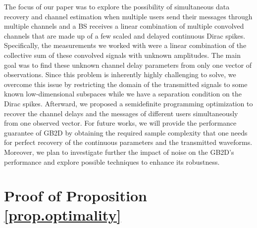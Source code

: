 \documentclass[conference,10pt]{IEEEtran}
\theoremstyle{remark}
\theoremstyle{plain}
\theoremstyle{definition}
\theoremstyle{remark}
\begin{document}
The focus of our paper was to explore the possibility of simultaneous data recovery and channel estimation when multiple users send their messages through multiple channels and a \ac{BS} receives a linear combination of multiple convolved channels that are made up of a few scaled and delayed continuous Dirac spikes. Specifically, the measurements we worked with were a linear combination  of the collective sum of these convolved signals with unknown amplitudes.
The main goal was to find these unknown channel delay parameters from only one vector of observations. Since this problem is inherently highly challenging to solve, we overcome this issue by restricting the domain of the transmitted signals to some known low-dimensional subspaces while we have a separation condition on the Dirac spikes. Afterward, we proposed a semidefinite programming optimization to recover the channel delays and the messages of different users simultaneously from one observed vector.
For future works, we will provide the performance guarantee of \ac{GB2D} by obtaining the required sample complexity that one needs for perfect recovery of the continuous parameters and the transmitted waveforms.  Moreover, we plan to investigate further the impact of noise on the \ac{GB2D}'s performance and explore possible techniques to enhance its robustness. 
 



\appendix

\section{Proof of Proposition \ref{prop.optimality}}\label{proof.optimality}
\end{document}
